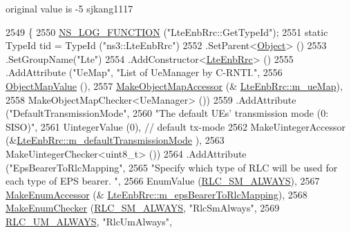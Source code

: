 original value is -\/5 sjkang1117 
\begin{DoxyCode}
2549 \{
2550   \hyperlink{log-macros-disabled_8h_a90b90d5bad1f39cb1b64923ea94c0761}{NS\_LOG\_FUNCTION} (\textcolor{stringliteral}{"LteEnbRrc::GetTypeId"});
2551   \textcolor{keyword}{static} TypeId tid = TypeId (\textcolor{stringliteral}{"ns3::LteEnbRrc"})
2552     .SetParent<\hyperlink{classns3_1_1Object_a40860402e64d8008fb42329df7097cdb}{Object}> ()
2553     .SetGroupName(\textcolor{stringliteral}{"Lte"})
2554     .AddConstructor<\hyperlink{classns3_1_1LteEnbRrc_a28603f43a736c5d9fab4831670fd4c7a}{LteEnbRrc}> ()
2555     .AddAttribute (\textcolor{stringliteral}{"UeMap"}, \textcolor{stringliteral}{"List of UeManager by C-RNTI."},
2556                    \hyperlink{namespacens3_a5cac680c954929d49b48f4c40c1a2e08}{ObjectMapValue} (),
2557                    \hyperlink{namespacens3_acfdf708e388c66beea68eb5ecdcb7456}{MakeObjectMapAccessor} (&
      \hyperlink{classns3_1_1LteEnbRrc_a7cf28bbc2890b86221ed1d901da8ad73}{LteEnbRrc::m\_ueMap}),
2558                    MakeObjectMapChecker<UeManager> ())
2559     .AddAttribute (\textcolor{stringliteral}{"DefaultTransmissionMode"},
2560                    \textcolor{stringliteral}{"The default UEs' transmission mode (0: SISO)"},
2561                    UintegerValue (0),  \textcolor{comment}{// default tx-mode}
2562                    MakeUintegerAccessor (&\hyperlink{classns3_1_1LteEnbRrc_a5f1177a52d92540603594fbabb882a1d}{LteEnbRrc::m\_defaultTransmissionMode}
      ),
2563                    MakeUintegerChecker<uint8\_t> ())
2564     .AddAttribute (\textcolor{stringliteral}{"EpsBearerToRlcMapping"}, 
2565                    \textcolor{stringliteral}{"Specify which type of RLC will be used for each type of EPS bearer. "},
2566                    EnumValue (\hyperlink{classns3_1_1LteEnbRrc_a1c748bf2d69860b866dfda2a38427842aacda149c15c085eb654d411b64f62770}{RLC\_SM\_ALWAYS}),
2567                    \hyperlink{namespacens3_af5050739867ce63896dec011e332c8ec}{MakeEnumAccessor} (&
      \hyperlink{classns3_1_1LteEnbRrc_ad90d6c8a5ef8ee123ba68498cc20df5c}{LteEnbRrc::m\_epsBearerToRlcMapping}),
2568                    \hyperlink{namespacens3_a48832781a2b521d3d0091e05ece30615}{MakeEnumChecker} (\hyperlink{classns3_1_1LteEnbRrc_a1c748bf2d69860b866dfda2a38427842aacda149c15c085eb654d411b64f62770}{RLC\_SM\_ALWAYS}, \textcolor{stringliteral}{"RlcSmAlways"},
2569                                     \hyperlink{classns3_1_1LteEnbRrc_a1c748bf2d69860b866dfda2a38427842acde4cbe52f3092f0b832b8c540329332}{RLC\_UM\_ALWAYS}, \textcolor{stringliteral}{"RlcUmAlways"},

\end{DoxyCode}
